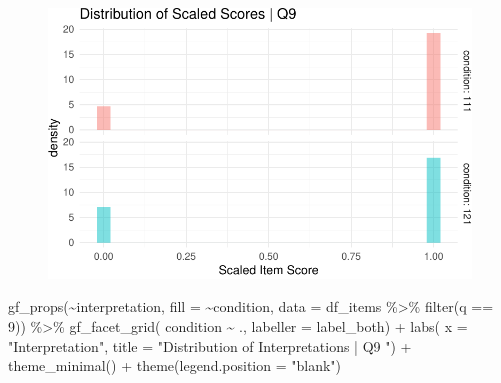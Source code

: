 \documentclass[
  letterpaper,
  DIV=11,
  numbers=noendperiod]{scrreprt}
\newenvironment{Shaded}{\begin{snugshade}}{\end{snugshade}}
\newcommand{\AttributeTok}[1]{\textcolor[rgb]{0.40,0.45,0.13}{#1}}
\newcommand{\DecValTok}[1]{\textcolor[rgb]{0.68,0.00,0.00}{#1}}
\newcommand{\FunctionTok}[1]{\textcolor[rgb]{0.28,0.35,0.67}{#1}}
\newcommand{\NormalTok}[1]{\textcolor[rgb]{0.00,0.23,0.31}{#1}}
\newcommand{\SpecialCharTok}[1]{\textcolor[rgb]{0.37,0.37,0.37}{#1}}
\newcommand{\StringTok}[1]{\textcolor[rgb]{0.13,0.47,0.30}{#1}}
\begin{document}
\begin{figure}[H]

{\centering \includegraphics{analysis/SGC3A/2_sgc3A_scoring_files/figure-pdf/Q9-distribution-1.pdf}

}

\end{figure}

\begin{Shaded}
\begin{Highlighting}[]
\FunctionTok{gf\_props}\NormalTok{(}\SpecialCharTok{\textasciitilde{}}\NormalTok{interpretation, }\AttributeTok{fill =} \SpecialCharTok{\textasciitilde{}}\NormalTok{condition, }\AttributeTok{data =}\NormalTok{ df\_items }\SpecialCharTok{\%\textgreater{}\%} \FunctionTok{filter}\NormalTok{(q }\SpecialCharTok{==} \DecValTok{9}\NormalTok{)) }\SpecialCharTok{\%\textgreater{}\%} 
  \FunctionTok{gf\_facet\_grid}\NormalTok{( condition }\SpecialCharTok{\textasciitilde{}}\NormalTok{ ., }\AttributeTok{labeller =}\NormalTok{ label\_both) }\SpecialCharTok{+} 
  \FunctionTok{labs}\NormalTok{( }\AttributeTok{x =} \StringTok{"Interpretation"}\NormalTok{, }\AttributeTok{title =} \StringTok{"Distribution of Interpretations | Q9 "}\NormalTok{) }\SpecialCharTok{+} 
  \FunctionTok{theme\_minimal}\NormalTok{() }\SpecialCharTok{+} \FunctionTok{theme}\NormalTok{(}\AttributeTok{legend.position =} \StringTok{"blank"}\NormalTok{)}
\end{Highlighting}
\end{Shaded}
\end{document}
